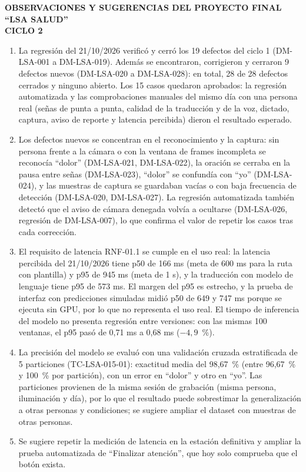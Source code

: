 \documentclass[10pt,a4paper]{article}
\begin{document}
\begin{center}
  \textbf{OBSERVACIONES Y SUGERENCIAS DEL PROYECTO FINAL ``LSA SALUD''\\ CICLO 2}
\end{center}

\vspace{0.5em}

\begin{enumerate}
  \item La regresión del 21/10/2026 verificó y cerró los 19 defectos del ciclo 1
    (\mbox{DM-LSA-001} a \mbox{DM-LSA-019}). Además se encontraron, corrigieron y cerraron 9 defectos
    nuevos (\mbox{DM-LSA-020} a \mbox{DM-LSA-028}): en total, 28 de 28 defectos cerrados y ninguno abierto.
    Los 15 casos quedaron aprobados: la regresión automatizada y las comprobaciones manuales del
    mismo día con una persona real (señas de punta a punta, calidad de la traducción y de la voz,
    dictado, captura, aviso de reporte y latencia percibida) dieron el resultado esperado.
  \item Los defectos nuevos se concentran en el reconocimiento y la captura: sin persona frente a la
    cámara o con la ventana de frames incompleta se reconocía ``dolor'' (\mbox{DM-LSA-021},
    \mbox{DM-LSA-022}), la oración se cerraba en la pausa entre señas (\mbox{DM-LSA-023}), ``dolor'' se
    confundía con ``yo'' (\mbox{DM-LSA-024}), y las muestras de captura se guardaban vacías o con baja
    frecuencia de detección (\mbox{DM-LSA-020}, \mbox{DM-LSA-027}). La regresión automatizada también
    detectó que el aviso de cámara denegada volvía a ocultarse (\mbox{DM-LSA-026}, regresión de
    \mbox{DM-LSA-007}), lo que confirma el valor de repetir los casos tras cada corrección.
  \item El requisito de latencia RNF-01.1 se cumple en el uso real: la latencia percibida del 21/10/2026
    tiene p50 de 166 ms (meta de 600 ms para la ruta con plantilla) y p95 de 945 ms (meta de 1 s), y
    la traducción con modelo de lenguaje tiene p95 de 573 ms. El margen del p95 es estrecho, y la prueba
    de interfaz con predicciones simuladas midió p50 de 649 y 747 ms porque se ejecuta sin GPU, por lo
    que no representa el uso real. El tiempo de inferencia del modelo no presenta regresión entre
    versiones: con las mismas 100 ventanas, el p95 pasó de 0,71 ms a 0,68 ms ($-4{,}9$~\%).
  \item La precisión del modelo se evaluó con una validación cruzada estratificada de 5 particiones
    (\mbox{TC-LSA-015-01}): exactitud media del 98,67~\% (entre 96,67~\% y 100~\% por partición), con
    un error en ``dolor'' y otro en ``yo''. Las particiones provienen de la misma sesión de grabación
    (misma persona, iluminación y día), por lo que el resultado puede sobrestimar la generalización a
    otras personas y condiciones; se sugiere ampliar el dataset con muestras de otras personas.
  \item Se sugiere repetir la medición de latencia en la estación definitiva y ampliar la prueba
    automatizada de ``Finalizar atención'', que hoy solo comprueba que el botón exista.
\end{enumerate}
\end{document}
